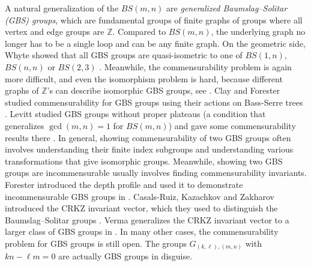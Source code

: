 \documentclass[10pt]{article}
\def\integers{{\mathbb{Z}}}
\theoremstyle{definition}
\begin{document}
A natural generalization of the $BS(m,n)$ are \textit{generalized Baumslag--Solitar (GBS) groups}, which are  fundamental groups of finite graphs of groups where all vertex and edge groups are $\integers$. Compared to $BS(m,n)$, the underlying graph no longer has to  be a single loop and can be any finite graph. On the geometric side, Whyte showed that all GBS groups are  quasi-isometric to one of $BS(1,n)$, $BS(n,n)$ or $BS(2,3)$ \cite{Whyte}. Meanwhile, the commensurability problem is again more difficult, and even the isomorphism problem is hard, because different graphs of $\integers$'s can describe isomorphic GBS groups, see \cite{CF08}. Clay and Forester studied commensurability for GBS groups using their actions on Bass-Serre trees \cite{CF09}. Levitt studied GBS groups without proper plateaus (a condition that generalizes $\gcd(m,n)=1$ for $BS(m,n)$) and gave some commensurability results there \cite{Lev}. In general, showing commensurability of two GBS groups often involves understanding their finite index subgroups and understanding various transformations that give isomorphic groups. Meanwhile, showing two GBS groups are incommensurable usually involves finding  commensurability invariants. Forester introduced the depth profile and used it to demonstrate incommensurable GBS groups in \cite{For24}. Casals-Ruiz, Kazachkov and Zakharov introduced the CRKZ invariant vector, which they used to distinguish the Baumslag--Solitar groups \cite{CRKZ}. Verma generalizes the CRKZ invariant vector to a larger class of GBS groups in \cite{Verma}. In many other cases, the commensurability problem for GBS groups is still open. The groups $G_{(k,\ell),(m,n)}$ with $kn-\ell m =0$ are actually GBS groups in disguise. 
\end{document}
